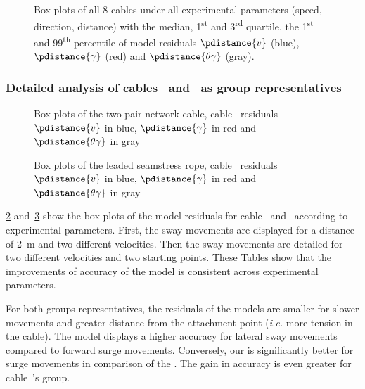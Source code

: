 \begin{figure}
	\centering
	\caption{
		Box plots of  all 8 cables under all experimental parameters (speed, direction, distance) with the median,
		1\textsuperscript{st} and 3\textsuperscript{rd} quartile, the 1\textsuperscript{st} and 99\textsuperscript{th} percentile
		of model residuals $\pdistance{v}$ (blue), $\pdistance{\gamma}$ (red) and $\pdistance{\theta\gamma}$ (gray).
	}
	\label{cable_modelization_fig_boxplot_all}
\end{figure}

\subsubsection{Detailed analysis of cables~ and~ as group representatives}

\begin{figure}
	\centering
	\caption{
		Box plots of the two-pair network cable, cable~ residuals
		$\pdistance{v}$ in blue,
		$\pdistance{\gamma}$ in red and $\pdistance{\theta\gamma}$ in gray
	}
	\label{cable_modelization_tab_parameters_cable3}
\end{figure}

\begin{figure}
	\centering
	\caption{
		Box plots of the leaded seamstress rope, cable~ residuals
		$\pdistance{v}$ in blue,
		$\pdistance{\gamma}$ in red and $\pdistance{\theta\gamma}$ in gray
	}
	\label{cable_modelization_tab_parameters_cable6}
\end{figure}

\cref{cable_modelization_tab_parameters_cable3} and~\cref{cable_modelization_tab_parameters_cable6}
show the box plots of the model residuals for cable~
and~ according to experimental parameters. First, the
sway movements are displayed for a distance of \qty{2}{\m} and two different velocities. Then the
sway movements are detailed for two different velocities and two starting points. These Tables show
that the improvements of accuracy of the \thetagammamodel{} model is consistent across experimental
parameters.

For both groups representatives, the residuals of the models are smaller for slower movements and
greater distance from the attachment point (\textit{i.e.} more tension in the cable). The
\gammamodel{} model displays a higher accuracy for lateral sway movements compared to forward surge
movements. Conversely, our \thetagammamodel{} is significantly better for surge movements in
comparison of the \gammamodel{}. The gain in accuracy is even greater for
cable~'s group.

